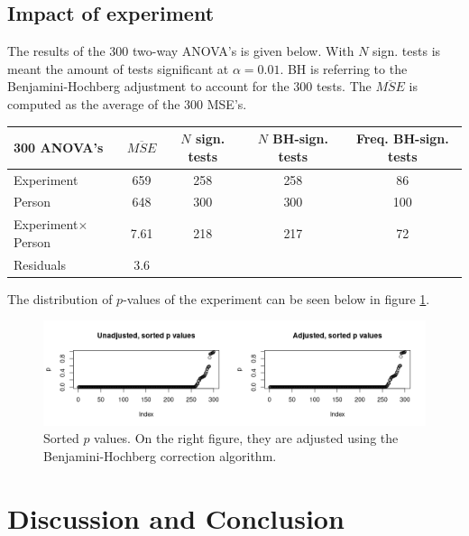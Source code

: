 \documentclass[11pt,fleqn]{article}
\begin{document}
\subsection{Impact of experiment}
The results of the 300 two-way ANOVA's is given below. With \(N\) sign. tests is meant the amount of tests significant at \(\alpha = 0.01\). BH is referring to the Benjamini-Hochberg adjustment to account for the 300 tests. The \(\overline{ MSE}\) is computed as the average of the 300 MSE's.
\begin{table}[H]
	\centering
	\begin{tabular}{l | c c c c}
		300 ANOVA's & \(\overline{MSE}\) & \(N\) sign. tests& \(N\) BH-sign. tests& Freq. BH-sign. tests\\
		\hline 
		Experiment  & 659 	& 258 & 258 	& 86\pro	\\
		Person  & 648 		&  300 & 300	&100\pro  \\
		Experiment\(\times\)Person&7.61  & 218 & 217 &	72\pro	\\
		Residuals &3.6 &			
	\end{tabular}
	\label{tab:ranova}
\end{table}\noindent
The distribution of \(p\)-values of the experiment can be seen below in figure \ref{fig:sortp}.
\begin{figure}[H]
	\centering
	\includegraphics[width=.8\textwidth]{pvalues}
	\caption{Sorted $ p $ values. On the right figure, they are adjusted using the Benjamini-Hochberg correction algorithm.}\label{fig:sortp}
\end{figure}

\section{Discussion and Conclusion}
\end{document}
